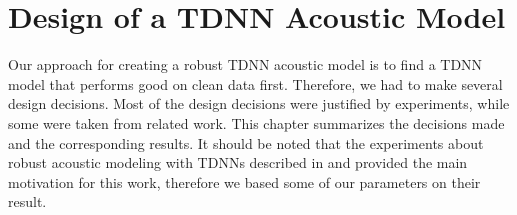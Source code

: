 
\chapter{Design of a TDNN Acoustic Model}
\label{ch:tdnn_design}
Our approach for creating a robust TDNN acoustic model is to find a TDNN model that performs good on clean data first. Therefore, we had to make several design decisions. Most of the design decisions were justified by experiments, while some were taken from related work. This chapter summarizes the decisions made and the corresponding results. It should be noted that the experiments about robust acoustic modeling with TDNNs described in \cite{peddinti2015jhu} and \cite{peddinti2015reverberation} provided the main motivation for this work, therefore we based some of our parameters on their result.
